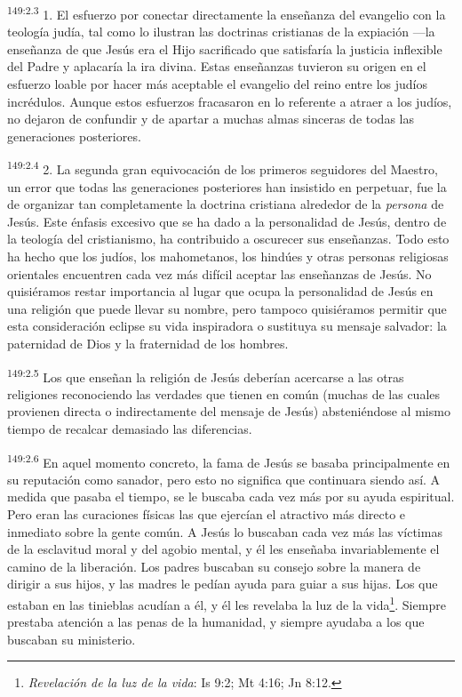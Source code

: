\par 
\textsuperscript{149:2.3} 1. El esfuerzo por conectar directamente la enseñanza del evangelio con la teología judía, tal como lo ilustran las doctrinas cristianas de la expiación ---la enseñanza de que Jesús era el Hijo sacrificado que satisfaría la justicia inflexible del Padre y aplacaría la ira divina. Estas enseñanzas tuvieron su origen en el esfuerzo loable por hacer más aceptable el evangelio del reino entre los judíos incrédulos. Aunque estos esfuerzos fracasaron en lo referente a atraer a los judíos, no dejaron de confundir y de apartar a muchas almas sinceras de todas las generaciones posteriores.

\par 
\textsuperscript{149:2.4} 2. La segunda gran equivocación de los primeros seguidores del Maestro, un error que todas las generaciones posteriores han insistido en perpetuar, fue la de organizar tan completamente la doctrina cristiana alrededor de la \textit{persona} de Jesús. Este énfasis excesivo que se ha dado a la personalidad de Jesús, dentro de la teología del cristianismo, ha contribuido a oscurecer sus enseñanzas. Todo esto ha hecho que los judíos, los mahometanos, los hindúes y otras personas religiosas orientales encuentren cada vez más difícil aceptar las enseñanzas de Jesús. No quisiéramos restar importancia al lugar que ocupa la personalidad de Jesús en una religión que puede llevar su nombre, pero tampoco quisiéramos permitir que esta consideración eclipse su vida inspiradora o sustituya su mensaje salvador: la paternidad de Dios y la fraternidad de los hombres.

\par 
\textsuperscript{149:2.5} Los que enseñan la religión de Jesús deberían acercarse a las otras religiones reconociendo las verdades que tienen en común (muchas de las cuales provienen directa o indirectamente del mensaje de Jesús) absteniéndose al mismo tiempo de recalcar demasiado las diferencias.

\par 
\textsuperscript{149:2.6} En aquel momento concreto, la fama de Jesús se basaba principalmente en su reputación como sanador, pero esto no significa que continuara siendo así. A medida que pasaba el tiempo, se le buscaba cada vez más por su ayuda espiritual. Pero eran las curaciones físicas las que ejercían el atractivo más directo e inmediato sobre la gente común. A Jesús lo buscaban cada vez más las víctimas de la esclavitud moral y del agobio mental, y él les enseñaba invariablemente el camino de la liberación. Los padres buscaban su consejo sobre la manera de dirigir a sus hijos, y las madres le pedían ayuda para guiar a sus hijas. Los que estaban en las tinieblas acudían a él, y él les revelaba la luz de la vida\footnote{\textit{Revelación de la luz de la vida}: Is 9:2; Mt 4:16; Jn 8:12.}. Siempre prestaba atención a las penas de la humanidad, y siempre ayudaba a los que buscaban su ministerio.


